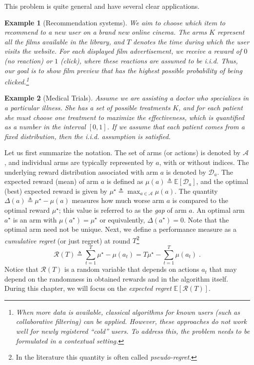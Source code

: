 \documentclass{article}
\numberwithin{equation}{section}
\newtheorem{example}{Example}
\newcommand{\E}{\mathbb E}
\newcommand{\cA}{\mathcal{A}}
\newcommand{\cD}{\mathcal{D}}
\newcommand{\eqsp}{\;}
\begin{document}
This problem is quite general and have several clear applications.
\begin{example}[Recommendation systems]
    We aim to choose which item to recommend to a new user on a brand new online cinema. The arms $K$ represent all the films available in the library, and $T$ denotes the time during which the user visits the website. For each displayed film advertisement, we receive a reward of $0$ (no reaction) or $1$ (click), where these reactions are assumed to be i.i.d. Thus, our goal is to show film preview that has the highest possible probability of being clicked.\footnote{When more data is available, classical algorithms for known users (such as collaborative filtering) can be applied. However, these approaches do not work well for newly registered “cold” users. To address this, the problem needs to be formulated in a contextual setting.}
\end{example}

\begin{example}[Medical Trials]
    Assume we are assisting a doctor who specializes in a particular illness. She has a set of possible treatments $K$, and for each patient she must choose one treatment to maximize the effectiveness, which is quantified as a number in the interval $[0,1]$. If we assume that each patient comes from a fixed distribution, then the i.i.d. assumption is satisfied.
\end{example}
Let us first summarize the notation. The set of arms (or actions) is denoted by $\mathcal{A}$, and individual arms are typically represented by $a$, with or without indices. The underlying reward distribution associated with arm $a$ is denoted by $\mathcal{D}_a$. The expected reward (mean) of arm $a$ is defined as $\mu(a) \triangleq \E[\cD_a]$, and the optimal (best) expected reward is given by $\mu^\star \triangleq \max_{a \in \cA} \mu(a)$. The quantity $\Delta(a) \triangleq \mu^\star - \mu(a)$ measures how much worse arm $a$ is compared to the optimal reward $\mu^\star$; this value is referred to as the \textit{gap} of arm $a$. An optimal arm $a^\star$ is an arm with $\mu(a^\star) = \mu^\star$ or equivalently, $\Delta(a^\star) = 0$. Note that the optimal arm need not be unique. Next, we define a performance measure as a \textit{cumulative regret} (or just regret) at round $T$\footnote{In the literature this quantity is often called \textit{pseudo-regret}.}
\[
    \mathcal{R}(T) \triangleq \sum_{t=1}^T \mu^\star - \mu(a_t) = T \mu^\star - \sum_{t=1}^T \mu(a_t)\eqsp.
\]
Notice that $\mathcal{R}(T)$ is a random variable that depends on actions $a_t$ that may depend on the randomness in obtained rewards and in the algorithm itself. During this chapter, we will focus on the \textit{expected regret} $\E[\mathcal{R}(T)]$. 
\end{document}
